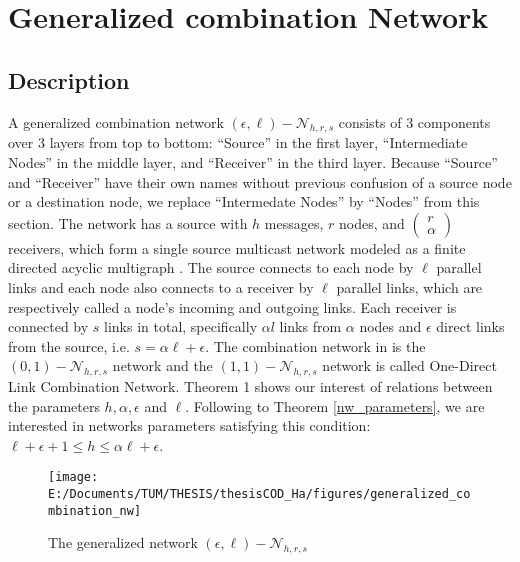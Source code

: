 \chapter{Generalized combination Network} \label{chap:general_network}

\section{Description \label{sec:Description_GCN}}

A generalized combination network $(\epsilon,\ell)-\mathcal{N}_{h,r,s}$
consists of 3 components over 3 layers from top to bottom: ``Source''
in the first layer, ``Intermediate Nodes'' in the middle layer,
and ``Receiver'' in the third layer. Because ``Source'' and ``Receiver''
have their own names without previous confusion of a source node or
a destination node, we replace ``Intermedate Nodes'' by ``Nodes''
from this section. The network has a source with $h$ messages, $r$
nodes, and $\left(\begin{array}{c}
r\\
\alpha
\end{array}\right)$ receivers, which form a single source multicast network modeled as
a finite directed acyclic multigraph \cite{Li:2003}. The source connects
to each node by $\ell$ parallel links and each node also connects
to a receiver by $\ell$ parallel links, which are respectively called
a node's incoming and outgoing links. Each receiver is connected by
$s$ links in total, specifically $\alpha l$ links from $\alpha$
nodes and $\epsilon$ direct links from the source, i.e. $s=\alpha\ell+\epsilon$.
The combination network in \cite{Riis:2006} is the $(0,1)-\mathcal{N}_{h,r,s}$
network and the $(1,1)-\mathcal{N}_{h,r,s}$ network is called One-Direct
Link Combination Network. Theorem 1 shows our interest of relations
between the parameters $h,\alpha,\epsilon$ and $\ell$. Following
to Theorem \ref{nw_parameters}, we are interested in networks parameters
satisfying this condition: $\ell+\epsilon+1\leq h\leq\alpha\ell+\epsilon$.
\begin{figure}[H]
\caption{The generalized network $(\epsilon,\ell)-\mathcal{N}_{h,r,s}$\label{fig:The-generalized-network}}

\centering{}\texttt{[image: E:/Documents/TUM/THESIS/thesisCOD\_Ha/figures/generalized\_combination\_nw]}
\end{figure}

